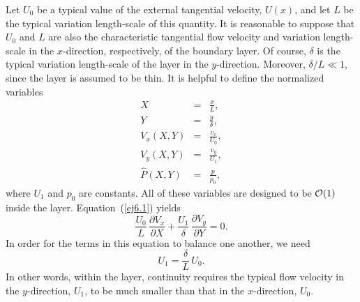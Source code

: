 Let $U_0$ be a typical value of the external tangential velocity, $U(x)$, and let $L$ be the typical variation length-scale
of this quantity.  It is reasonable to suppose  that $U_0$ and $L$ are also the characteristic tangential flow velocity and variation length-scale in the $x$-direction, respectively,  of the boundary layer.
Of course, $\delta$ is the typical variation length-scale of the  layer in the $y$-direction. Moreover, $\delta/L\ll 1$,
since the layer is assumed to be thin. 
It is helpful to define the normalized variables
\begin{eqnarray}
X &=& \frac{x}{L},\\[0.5ex]
Y&=& \frac{y}{\delta},\\[0.5ex]
V_x(X,Y) &=& \frac{v_x}{U_0},\\[0.5ex]
V_y(X,Y) &=& \frac{v_y}{U_1},\\[0.5ex]
\widehat{P}(X,Y)&=& \frac{p}{p_0},
\end{eqnarray}
where $U_1$ and $p_0$ are constants. 
All of these variables are designed to be ${\cal O}(1)$ inside the layer. Equation~(\ref{ej6.1}) yields
\begin{equation}
\frac{U_0}{L}\,\frac{\partial V_x}{\partial X} + \frac{U_1}{\delta}\,\frac{\partial V_y}{\partial Y} = 0.
\end{equation}
In order for the terms in this equation to balance one another, we need
\begin{equation}
U _1= \frac{\delta}{L}\,U_0.
\end{equation}
In other words, within  the layer, continuity requires the typical flow velocity in the $y$-direction, $U_1$, to be much smaller than
that in the $x$-direction, $U_0$. 

